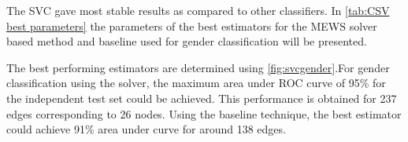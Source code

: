 \documentclass[msthesis.tex]{subfiles}
\begin{document}
The SVC gave most stable results as compared to other classifiers. In \autoref{tab:CSV best parameters} the parameters of the best estimators for the MEWS solver based method and baseline used for gender classification will be presented.

The best performing estimators are determined using \autoref{fig:svcgender}.For gender classification using the solver, the maximum area under ROC curve of 95\% for the independent test set could be achieved. This performance is obtained for 237 edges corresponding to 26 nodes. Using the baseline technique, the best estimator could achieve 91\% area under curve  for around 138 edges.
\end{document}
